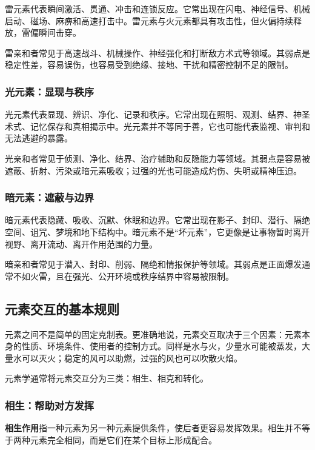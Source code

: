 雷元素代表瞬间激活、贯通、冲击和连锁反应。它常出现在闪电、神经信号、机械启动、磁场、麻痹和高速打击中。雷元素与火元素都具有攻击性，但火偏持续释放，雷偏瞬间击穿。

雷亲和者常见于高速战斗、机械操作、神经强化和打断敌方术式等领域。其弱点是稳定性差，容易误伤，也容易受到绝缘、接地、干扰和精密控制不足的限制。

\subsubsection{光元素：显现与秩序}

光元素代表显现、辨识、净化、记录和秩序。它常出现在照明、观测、结界、神圣术式、记忆保存和真相揭示中。光元素并不等同于善，它也可能代表监视、审判和无法逃避的暴露。

光亲和者常见于侦测、净化、结界、治疗辅助和反隐能力等领域。其弱点是容易被遮蔽、折射、污染或暗元素吸收；过强的光也可能造成灼伤、失明或精神压迫。

\subsubsection{暗元素：遮蔽与边界}

暗元素代表隐藏、吸收、沉默、休眠和边界。它常出现在影子、封印、潜行、隔绝空间、诅咒、梦境和地下结构中。暗元素不是“坏元素”，它更像是让事物暂时离开视野、离开流动、离开作用范围的力量。

暗亲和者常见于潜入、封印、削弱、隔绝和情报保护等领域。其弱点是正面爆发通常不如火雷，且在强光、公开环境或秩序结界中容易被限制。

\subsection{元素交互的基本规则}\label{subsec:elementinteraction}

元素之间不是简单的固定克制表。更准确地说，元素交互取决于三个因素：元素本身的性质、环境条件、使用者的控制方式。同样是水与火，少量水可能被蒸发，大量水可以灭火；稳定的风可以助燃，过强的风也可以吹散火焰。

元素学通常将元素交互分为三类：相生、相克和转化。

\subsubsection{相生：帮助对方发挥}

\textbf{相生作用}指一种元素为另一种元素提供条件，使后者更容易发挥效果。相生并不等于两种元素完全相同，而是它们在某个目标上形成配合。

